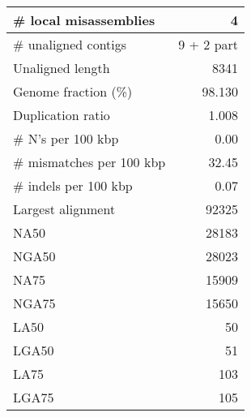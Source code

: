 \documentclass[12pt,a4paper]{article}
\begin{document}
\begin{table}[ht]
\begin{center}
\begin{tabular}{|l*{1}{|r}|}
\# local misassemblies & 4 \\ \hline
\# unaligned contigs & 9 + 2 part \\ \hline
Unaligned length & 8341 \\ \hline
Genome fraction (\%) & 98.130 \\ \hline
Duplication ratio & 1.008 \\ \hline
\# N's per 100 kbp & 0.00 \\ \hline
\# mismatches per 100 kbp & 32.45 \\ \hline
\# indels per 100 kbp & 0.07 \\ \hline
Largest alignment & 92325 \\ \hline
NA50 & 28183 \\ \hline
NGA50 & 28023 \\ \hline
NA75 & 15909 \\ \hline
NGA75 & 15650 \\ \hline
LA50 & 50 \\ \hline
LGA50 & 51 \\ \hline
LA75 & 103 \\ \hline
LGA75 & 105 \\ \hline
\end{tabular}
\end{center}
\end{table}
\end{document}
